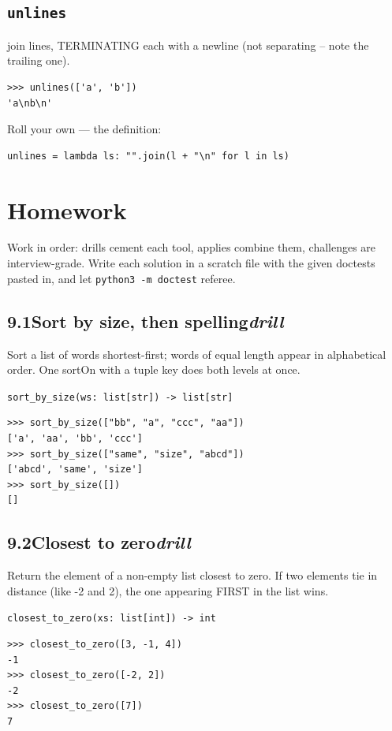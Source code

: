 \documentclass[10pt,letterpaper]{book}
\begin{document}
\subsection{\texttt{unlines}}\label{def:unlines}
join lines, TERMINATING each with a newline (not separating -- note the trailing one).
\begin{lstlisting}[style=ex]
>>> unlines(['a', 'b'])
'a\nb\n'
\end{lstlisting}

Roll your own --- the definition:

\begin{lstlisting}[style=ex]
unlines = lambda ls: "".join(l + "\n" for l in ls)
\end{lstlisting}
\section{Homework}
Work in order: drills cement each tool, applies combine them,
challenges are interview-grade. Write each solution in a scratch file with
the given doctests pasted in, and let \texttt{python3 -m doctest} referee.
\subsection*{9.1\quad Sort by size, then spelling\hfill\textnormal{\textit{drill}}}
Sort a list of words shortest-first; words of equal length appear in alphabetical order. One sortOn with a tuple key does both levels at once.

\noindent\texttt{sort\_by\_size(ws: list[str]) -> list[str]}
\begin{lstlisting}[style=ex]
>>> sort_by_size(["bb", "a", "ccc", "aa"])
['a', 'aa', 'bb', 'ccc']
>>> sort_by_size(["same", "size", "abcd"])
['abcd', 'same', 'size']
>>> sort_by_size([])
[]
\end{lstlisting}
\subsection*{9.2\quad Closest to zero\hfill\textnormal{\textit{drill}}}
Return the element of a non-empty list closest to zero. If two elements tie in distance (like -2 and 2), the one appearing FIRST in the list wins.

\noindent\texttt{closest\_to\_zero(xs: list[int]) -> int}
\begin{lstlisting}[style=ex]
>>> closest_to_zero([3, -1, 4])
-1
>>> closest_to_zero([-2, 2])
-2
>>> closest_to_zero([7])
7
\end{lstlisting}
\end{document}

